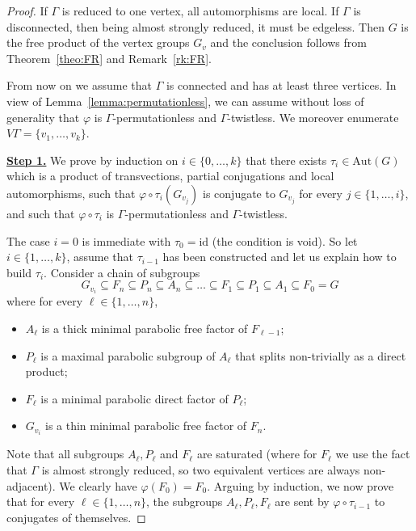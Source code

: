 \documentclass[a4paper,english,11pt]{article}
\theoremstyle{definition}
\theoremstyle{remark}
\newcommand{\Aut}{\mathrm{Aut}}
\begin{document}
\begin{proof}
If $\Gamma$ is reduced to one vertex, all automorphisms are local. If $\Gamma$ is disconnected, then being almost strongly reduced, it must be edgeless. Then $G$ is the free product of the vertex groups $G_v$ and the conclusion follows from Theorem~\ref{theo:FR} and Remark~\ref{rk:FR}. 

From now on we assume that $\Gamma$ is connected and has at least three vertices. In view of Lemma~\ref{lemma:permutationless}, we can assume without loss of generality that $\varphi$ is $\Gamma$-permutationless and $\Gamma$-twistless. We moreover enumerate $V\Gamma=\{v_1,\dots,v_k\}$.
\medskip

\underline{\textbf{Step 1.}} We prove by induction on $i\in\{0,\dots,k\}$ that there exists $\tau_i\in\Aut(G)$ which is a product of transvections, partial conjugations and local automorphisms, such that $\varphi\circ\tau_i(G_{v_j})$ is conjugate to $G_{v_j}$ for every $j\in\{1,\dots,i\}$, and such that $\varphi\circ\tau_i$ is $\Gamma$-permutationless and $\Gamma$-twistless. 

\smallskip

The case $i=0$ is immediate with $\tau_0=\mathrm{id}$ (the condition is void). So let $i\in\{1,\dots,k\}$, assume that $\tau_{i-1}$ has been constructed and let us explain how to build $\tau_{i}$. Consider a chain of subgroups
\begin{equation*}
    G_{v_i}\subseteq F_{n}\subseteq P_{n}\subseteq A_{n}\subseteq\dots\subseteq F_1\subseteq P_1\subseteq A_1\subseteq F_0=G
\end{equation*} where for every  $\ell\in \{1,\dots,n\}$,
    \begin{itemize}
        \item $A_\ell$ is a thick minimal parabolic free factor of $F_{\ell-1}$;
        \item $P_\ell$ is a maximal parabolic subgroup of $A_\ell$ that splits non-trivially as a direct product;
        \item $F_\ell$ is a minimal parabolic direct factor of $P_\ell$;
        \item $G_{v_i}$ is a thin minimal parabolic free factor of $F_n$.
        \end{itemize}
Note that all subgroups $A_\ell,P_\ell$ and $F_\ell$ are saturated (where for $F_\ell$ we use the fact that $\Gamma$ is almost strongly reduced, so two equivalent vertices are always non-adjacent). We clearly have $\varphi(F_0)=F_0$. Arguing by induction, we now prove that for every $\ell\in\{1,\dots,n\}$, the subgroups $A_\ell, P_\ell, F_\ell$ are sent by $\varphi\circ\tau_{i-1}$ to conjugates of themselves.  


\end{proof}
\end{document}
